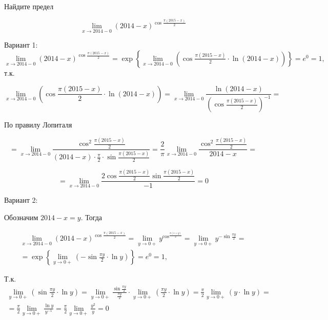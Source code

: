 \documentclass[addpoints, answers]{exam} %
\begin{document}
\begin{questions}



\question[10] Найдите предел

\[
\lim_{x\to 2014-0} (2014-x)^{\cos \frac{\pi (2015-x)}{2} } 
\]

\begin{solution}
Вариант 1:
$\mathop{\lim }\limits_{x\to 2014-0} (2014-x)^{\cos \frac{\pi (2015-x)}{2} } =\exp \left\{\mathop{\lim }\limits_{x\to 2014-0} \left(\cos \frac{\pi (2015-x)}{2} \cdot \ln (2014-x)\right)\right\}=e^{0} =1,$ т.к.

\[\mathop{\lim }\limits_{x\to 2014-0} \left(\cos \frac{\pi (2015-x)}{2} \cdot \ln (2014-x)\right)=\mathop{\lim }\limits_{x\to 2014-0} \frac{\ln (2014-x)}{\left(\cos \frac{\pi (2015-x)}{2} \right)^{-1} } =\] 

По правилу Лопиталя

\[=\mathop{\lim }\limits_{x\to 2014-0} \frac{\cos ^{2} \frac{\pi (2015-x)}{2} }{(2014-x)\cdot \frac{\pi }{2} \cdot \sin \frac{\pi (2015-x)}{2} } =\frac{2}{\pi } \mathop{\lim }\limits_{x\to 2014-0} \frac{\cos ^{2} \frac{\pi (2015-x)}{2} }{2014-x} =\] 

\[=\mathop{\lim }\limits_{x\to 2014-0} \frac{2\cos \frac{\pi (2015-x)}{2} \sin \frac{\pi (2015-x)}{2} }{-1} =0\] 


Вариант 2:

Обозначим $2014-x=y$. Тогда 

\[\begin{array}{l} {\mathop{\lim }\limits_{x\to 2014-0} (2014-x)^{\cos \frac{\pi (2015-x)}{2} } =\mathop{\lim }\limits_{y\to 0+} y^{\cos ^{\frac{\pi (1+y)}{2} } } =\mathop{\lim }\limits_{y\to 0+} y^{-\sin \frac{\pi y}{2} } =} \\ {=\exp \left\{\mathop{\lim }\limits_{y\to 0+} \left(-\sin \frac{\pi y}{2} \cdot \ln y\right)\right\}=e^{0} =1,} \end{array}\] 

Т.к. $\begin{array}{l} {\mathop{\lim }\limits_{y\to 0+} \left(\sin \frac{\pi y}{2} \cdot \ln y\right)=\mathop{\lim }\limits_{y\to 0+} \frac{\sin \frac{\pi y}{2} }{\frac{\pi y}{2} } \cdot \mathop{\lim }\limits_{y\to 0+} \left(\frac{\pi y}{2} \cdot \ln y\right)=\frac{\pi }{2} \mathop{\lim }\limits_{y\to 0+} \left(y\cdot \ln y\right)=} \\ {=\frac{\pi }{2} \mathop{\lim }\limits_{y\to 0+} \frac{\ln y}{y^{-1} } =\frac{\pi }{2} \mathop{\lim }\limits_{y\to 0+} \frac{y^{2} }{y} =0} \end{array}$


\end{solution}
\end{questions}
\end{document}
